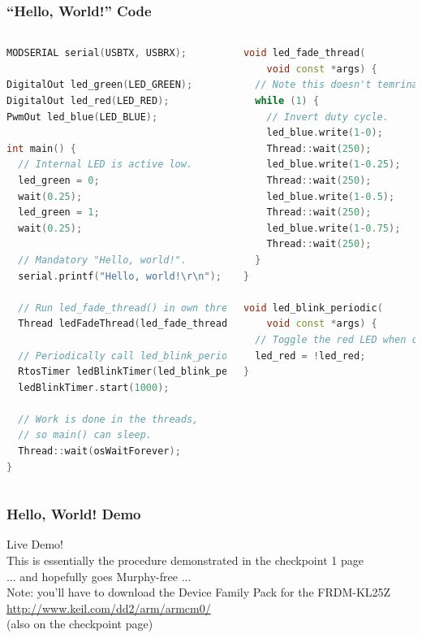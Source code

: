\documentclass{beamer}
\begin{document}
\begin{frame}[fragile]
\frametitle{``Hello, World!'' Code}
\begin{columns}[t]
\centering
\begin{lstlisting}[language=C++,basicstyle=\ttfamily\tiny]
MODSERIAL serial(USBTX, USBRX);

DigitalOut led_green(LED_GREEN);
DigitalOut led_red(LED_RED);
PwmOut led_blue(LED_BLUE);

int main() {
  // Internal LED is active low.
  led_green = 0;  
  wait(0.25);
  led_green = 1;
  wait(0.25);
  
  // Mandatory "Hello, world!".
  serial.printf("Hello, world!\r\n");

  // Run led_fade_thread() in own thread
  Thread ledFadeThread(led_fade_thread);
  
  // Periodically call led_blink_periodic()
  RtosTimer ledBlinkTimer(led_blink_periodic);
  ledBlinkTimer.start(1000);

  // Work is done in the threads,
  // so main() can sleep.
  Thread::wait(osWaitForever);
}
\end{lstlisting}

\begin{lstlisting}[language=C++,basicstyle=\ttfamily\tiny]
void led_fade_thread(
    void const *args) {
  // Note this doesn't temrinate.
  while (1) {
    // Invert duty cycle.
    led_blue.write(1-0);
    Thread::wait(250);
    led_blue.write(1-0.25);
    Thread::wait(250);
    led_blue.write(1-0.5);
    Thread::wait(250);
    led_blue.write(1-0.75);
    Thread::wait(250);
  }
}

void led_blink_periodic(
    void const *args) {
  // Toggle the red LED when called.
  led_red = !led_red;
}
\end{lstlisting}
\end{columns}
\end{frame}

\begin{frame}
\frametitle{Hello, World! Demo}
\begin{center}
{\huge Live Demo!} \\
\vspace{5mm}
\tiny{This is essentially the procedure demonstrated in the checkpoint 1 page} \\
\vspace{5mm}
\tiny{... and hopefully goes Murphy-free ...} \\
\vspace{10mm}
{\tiny Note: you'll have to download the Device Family Pack for the FRDM-KL25Z \\
\url{http://www.keil.com/dd2/arm/armcm0/} \\
(also on the checkpoint page)} \\
\end{center}
\end{frame}
\end{document}
